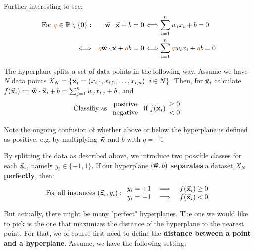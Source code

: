 Further interesting to see:
\begin{align*}\begin{aligned}
  \text{For } {\color{burntorange}q}\in\mathbb{R}\setminus\{0\}:&&
  \cv{w}\cdot\cv{x} + b = 0 &\Longleftrightarrow  \sum_{i=1}^n w_ix_i + b = 0\\
  \Longleftrightarrow && {\color{burntorange}q}\cv{w}\cdot\cv{x} + {\color{burntorange}q}b = 0 &\Longleftrightarrow  \sum_{i=1}^n {\color{burntorange}q}w_ix_i + {\color{burntorange}q}b = 0
\end{aligned}\end{align*}

The hyperplane splits a set of data points in the following way. Assume we have $N$ data points $X_N = \{\vec{\mathbf{x}}_i = (x_{i,1}, x_{i,2}, \dots, x_{i,n})\,|\,i\in N\}$. Then, for $\vec{\mathbf{x}}_i$ calculate $f(\vec{\mathbf{x}}_i) := \vec{\mathbf{w}}\cdot\vec{\mathbf{x}}_i + b = \sum_{j=1}^n w_jx_{i, j}+b$, and
\begin{align*}\begin{aligned}
  \textnormal{\color{black}{Classifiy as }} 
    \begin{array}{c}\textnormal{\color{black}{positive}}\\\textnormal{\color{black}{negative}}\end{array} 
  \textnormal{\color{black}{ if }} f(\vec{\mathbf{x}}_i)
    \begin{array}{c}\geq 0\\< 0\end{array}
\end{aligned}\end{align*}

Note the ongoing confusion of whether above or below the hyperplane is defined as positive, e.g. by multiplying $\vec{\mathbf{w}}$ and $b$ with $q=-1$

By splitting the data as described above, we introduce two possible classes for each $\vec{\mathbf{x}}_i$, namely $y_i \in \{-1, 1\}$. If our hyperplane $(\vec{\mathbf{w}}, b)$ \textbf{separates} a dataset $X_N$ \textbf{perfectly}, then:
\begin{align*}\begin{aligned}
  \textnormal{\color{black}{For all instances }} (\vec{\mathbf{x}}_i, y_i):
    \begin{array}{lll}y_i = + 1&\implies&f(\vec{\mathbf{x}}_i)\geq 0 \\y_i = - 1&\implies&f(\vec{\mathbf{x}}_i) < 0\end{array} 
\end{aligned}\end{align*}

But actually, there might be many "perfect" hyperplanes. The one we would like to pick is the one that maximizes the distance of the hyperplane to the nearest point. For that, we of course first need to define the \textbf{distance between a point and a hyperplane}. Assume, we have the following setting:

